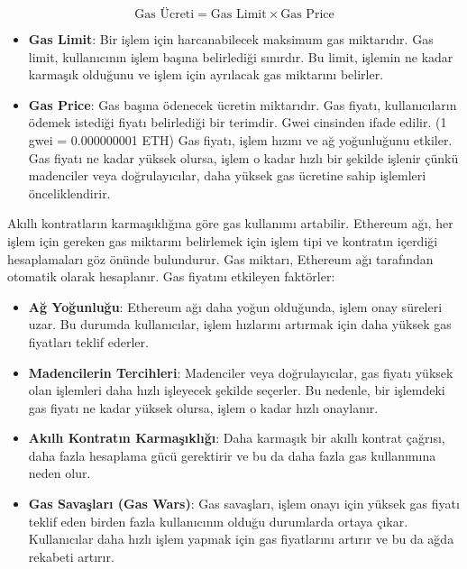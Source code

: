 \[ \text{Gas Ücreti} = \text{Gas Limit} \times \text{Gas Price} \]

\begin{itemize}
    \item \textbf{Gas Limit}: Bir işlem için harcanabilecek maksimum gas miktarıdır. Gas limit, kullanıcının işlem başına belirlediği sınırdır. Bu limit, işlemin ne kadar karmaşık olduğunu ve işlem için ayrılacak gas miktarını belirler.
    \item \textbf{Gas Price}: Gas başına ödenecek ücretin miktarıdır. Gas fiyatı, kullanıcıların ödemek istediği fiyatı belirlediği bir terimdir. Gwei cinsinden ifade edilir. (1 gwei = 0.000000001 ETH) Gas fiyatı, işlem hızını ve ağ yoğunluğunu etkiler. Gas fiyatı ne kadar yüksek olursa, işlem o kadar hızlı bir şekilde işlenir çünkü madenciler veya doğrulayıcılar, daha yüksek gas ücretine sahip işlemleri önceliklendirir.
\end{itemize}

Akıllı kontratların karmaşıklığına göre gas kullanımı artabilir. Ethereum ağı, her işlem için gereken gas miktarını belirlemek için işlem tipi ve kontratın içerdiği hesaplamaları göz önünde bulundurur. Gas miktarı, Ethereum ağı tarafından otomatik olarak hesaplanır. Gas fiyatını etkileyen faktörler:

\begin{itemize}
    \item \textbf{Ağ Yoğunluğu}: Ethereum ağı daha yoğun olduğunda, işlem onay süreleri uzar. Bu durumda kullanıcılar, işlem hızlarını artırmak için daha yüksek gas fiyatları teklif ederler.
    \item \textbf{Madencilerin Tercihleri}: Madenciler veya doğrulayıcılar, gas fiyatı yüksek olan işlemleri daha hızlı işleyecek şekilde seçerler. Bu nedenle, bir işlemdeki gas fiyatı ne kadar yüksek olursa, işlem o kadar hızlı onaylanır.
    \item \textbf{Akıllı Kontratın Karmaşıklığı}: Daha karmaşık bir akıllı kontrat çağrısı, daha fazla hesaplama gücü gerektirir ve bu da daha fazla gas kullanımına neden olur.
    \item \textbf{Gas Savaşları (Gas Wars)}: Gas savaşları, işlem onayı için yüksek gas fiyatı teklif eden birden fazla kullanıcının olduğu durumlarda ortaya çıkar. Kullanıcılar daha hızlı işlem yapmak için gas fiyatlarını artırır ve bu da ağda rekabeti artırır.
\end{itemize}

\newpage